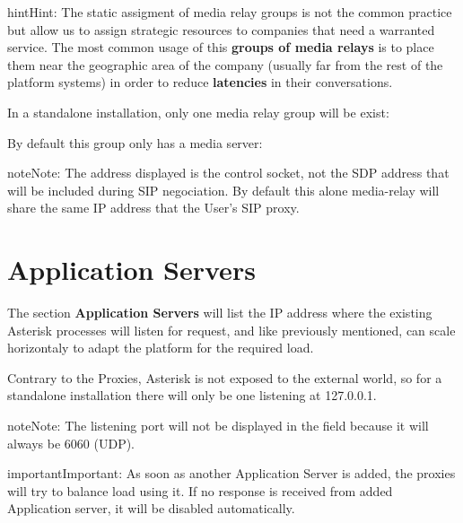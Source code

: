\documentclass[letterpaper,10pt,english]{sphinxmanual}
\begin{document}
\begin{notice}{hint}{Hint:}
The static assigment of media relay groups is not the common practice
but allow us to assign strategic resources to companies that need a warranted
service. The most common usage of this \textbf{groups of media relays} is to
place them near the geographic area of the company (usually far from the
rest of the platform systems) in order to reduce \textbf{latencies} in their
conversations.
\end{notice}

In a standalone installation, only one media relay group will be exist:

\noindent{}

By default this group only has a media server:

\noindent{}

\begin{notice}{note}{Note:}
The address displayed is the control socket, not the SDP address that
will be included during SIP negociation. By default this alone media-relay
will share the same IP address that the User's SIP proxy.
\end{notice}


\section{Application Servers}
\label{platform/application_servers::doc}\label{platform/application_servers:application-servers}
The section \textbf{Application Servers} will list the IP address where the existing
Asterisk processes will listen for request, and like previously mentioned,
can scale horizontaly to adapt the platform for the required load.

Contrary to the Proxies, Asterisk is not exposed to the external world, so
for a standalone installation there will only be one listening at 127.0.0.1.

\noindent{}

\begin{notice}{note}{Note:}
The listening port will not be displayed in the field because it will
always be 6060 (UDP).
\end{notice}

\begin{notice}{important}{Important:}
As soon as another Application Server is added, the proxies will
try to balance load using it. If no response is received from added
Application server, it will be disabled automatically.
\end{notice}
\end{document}

